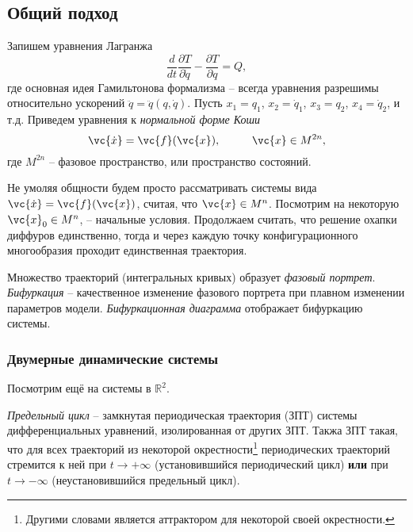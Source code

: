






\subsection*{Общий подход}


Запишем уравнения Лагранжа
\begin{equation*}
    \frac{d }{d t} \frac{\partial T}{\partial \dot{q}} - \frac{\partial T}{\partial q} = Q,
\end{equation*}
где основная идея Гамильтонова формализма -- всегда уравнения разрешимы относительно ускорений $\ddot{q} = \ddot{q} (q, \dot{q})$. Пусть 
$x_1 = q_1$, $x_2 = \dot{q}_1$, $x_3 = q_2$, $x_4 = \dot{q}_2$, и т.д. Приведем уравнения к \textit{нормальной форме Коши} 
\begin{equation*}
    \vc{\dot{x}} = \vc{f}(\vc{x}), \hspace{1 cm}
    \vc{x} \in M^{2n},
\end{equation*}
где $M^{2n}$ -- фазовое пространство, или пространство состояний. 

Не умоляя общности будем просто рассматривать системы вида $\vc{\dot{x}} = \vc{f}(\vc{x})$, считая, что $\vc{x} \in M^{n}$. Посмотрим на некоторую $\vc{x}_0 \in M^n$, -- начальные условия. Продолжаем считать, что решение охапки диффуров единственно, тогда и через каждую точку конфигурационного многообразия проходит единственная траектория.

\begin{to_def}
    Множество траекторий (интегральных кривых) образует \textit{фазовый портрет}.
    \textit{Бифуркация} -- качественное изменение фазового портрета при
    плавном изменении параметров модели. \textit{Бифуркационная диаграмма} отображает бифуркацию системы.
\end{to_def}


\subsubsection*{Двумерные динамические системы}

Посмотрим ещё на системы в $\mathbb{R}^2$. 

\begin{to_def}
    \textit{Предельный цикл}  -- замкнутая периодическая траектория (ЗПТ) системы дифференциальных уравнений, изолированная от других ЗПТ. Такжа ЗПТ такая, что для всех траекторий из некоторой окрестности\footnote{
        Другими словами является аттрактором для некоторой своей окрестности.
    }  периодических траекторий стремится к ней при $t \to + \infty$ (установившийся периодический цикл) \textbf{или} при $t \to - \infty$ (неустановившийся предельный цикл).
\end{to_def}
